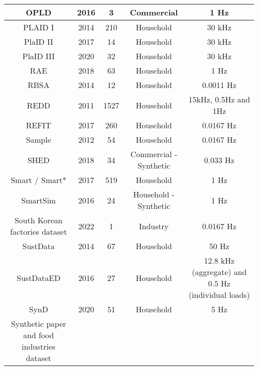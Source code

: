 \begin{table}[H]
{\begin{tabular}{|c|c|c|c|c|}
OPLD \cite{OPLD}                & 2016 & 3    & Commercial             & 1 Hz                               \\ \hline
PLAID I \cite{PLAIDI}           & 2014 & 210  & Household              & 30 kHz                             \\ \hline
PlaID II \cite{PLAIDII}         & 2017 & 14   & Household              & 30 kHz                             \\ \hline
PlaID III \cite{PLAIDIII}       & 2020 & 32   & Household              & 30 kHz                             \\ \hline
RAE \cite{RAE}                  & 2018 & 63   & Household              & 1 Hz                               \\ \hline
RBSA \cite{RBSA}                & 2014 & 12   & Household              & 0.0011 Hz                          \\ \hline
REDD \cite{REDD}                & 2011 & 1527 & Household              & 15kHz, 0.5Hz and 1Hz               \\ \hline
REFIT \cite{REFIT}              & 2017 & 260  & Household              & 0.0167 Hz                          \\ \hline
Sample                          & 2012 & 54   & Household              & 0.0167 Hz                          \\ \hline
SHED \cite{SHED}                & 2018 & 34   & Commercial - Synthetic & 0.033 Hz                           \\ \hline
Smart / Smart* \cite{Smart*}    & 2017 & 519  & Household              & 1 Hz                               \\ \hline
SmartSim \cite{SmartSim}        & 2016 & 24   & Household - Synthetic  & 1 Hz                               \\ \hline
South Korean factories dataset \cite{SouthKoreanfactories}        & 2022 & 1   & Industry  & 0.0167 Hz      \\ \hline
SustData \cite{SustData}        & 2014 & 67   & Household              & 50 Hz                              \\ \hline
SustDataED \cite{SustDataED}    & 2016 & 27   & Household              & 12.8 kHz (aggregate) and 0.5 Hz (individual loads) \\ \hline
SynD \cite{SynD}                & 2020 & 51   & Household              & 5 Hz                               \\ \hline
Synthetic paper and food industries dataset \cite{SyntheticIndustryDataset}    

\end{tabular}}
\end{table}
